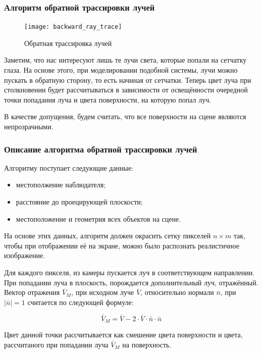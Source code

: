 \subsubsection{Алгоритм обратной трассировки лучей}
\begin{figure}[ht]
	\centering
	\texttt{[image: backward\_ray\_trace]}
	\caption{Обратная трассировка лучей}
	\label{fig:backward_ray_trace}
\end{figure}

Заметим, что нас интересуют лишь те лучи света, которые попали на сетчатку глаза. На основе этого, при моделировании подобной системы, лучи можно пускать в обратную сторону, то есть начиная от сетчатки. Теперь цвет луча при столкновении будет рассчитываться в зависимости от освещённости очередной точки попадания луча и цвета поверхности, на которую попал луч.

В качестве допущения, будем считать, что все поверхности на сцене являются непрозрачными.

\subsubsection{Описание алгоритма обратной трассировки лучей}
Алгоритму поступает следующие данные:
\begin{itemize}
	\item местополжение наблюдателя;
	\item расстояние до проецирующей плоскости;
	\item местоположение и геометрия всех объектов на сцене.
\end{itemize}

На основе этих данных, алгоритм должен окрасить сетку пикселей $n\times m$ так, чтобы при отображении её на экране, можно было распознать реалистичное изображение.

Для каждого пикселя, из камеры пускается луч в соответствующем направлении. При попадании луча в плоскость, порождается дополнительный луч, отражённый. Вектор отражения $\bar V_M$, при исходном луче $\bar V$, относительно нормали $\bar n$, при $|\bar n| = 1$ считается по следующей формуле:

\begin{equation}
	\bar V_M = \bar V - 2\cdot\bar V \cdot\bar n\cdot\bar n
	\label{eq:bounce}
\end{equation}

Цвет данной точки рассчитывается как смешение цвета поверхности и цвета, рассчитаного при попадании луча $\bar V_M$ на поверхность.

